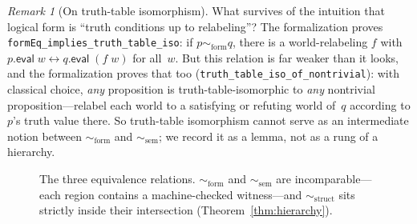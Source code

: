 \documentclass[10pt, letterpaper]{article}
\theoremstyle{definition}
\theoremstyle{remark}
\newtheorem{remark}[theorem]{Remark}
\newcommand{\eval}{\mathsf{eval}}
\newcommand{\structEq}{\sim_{\mathrm{struct}}}
\newcommand{\formEq}{\sim_{\mathrm{form}}}
\newcommand{\semEq}{\sim_{\mathrm{sem}}}
\begin{document}
\begin{remark}[On truth-table isomorphism]
\label{rem:tt-iso}
What survives of the intuition that logical form is
``truth conditions up to relabeling''?  The formalization proves
\texttt{formEq\_implies\_truth\_table\_iso}: if
$p \formEq q$, there is a world-relabeling $f$ with
$p.\eval\;w \leftrightarrow q.\eval\;(f\;w)$ for all~$w$.
But this relation is far weaker than it looks, and the
formalization proves that too
(\texttt{truth\_table\_iso\_of\_\allowbreak{}nontrivial}): with
classical choice, \emph{any} proposition is
truth-table-isomorphic to \emph{any} nontrivial
proposition---relabel each world to a satisfying or refuting
world of~$q$ according to $p$'s truth value there.  So
truth-table isomorphism cannot serve as an intermediate notion
between $\formEq$ and $\semEq$; we record it as a lemma, not as
a rung of a hierarchy.
\end{remark}

\begin{figure}[t]
\centering
{}
\caption{The three equivalence relations.  $\formEq$ and $\semEq$
  are incomparable---each region contains a machine-checked
  witness---and $\structEq$ sits strictly inside their
  intersection (Theorem~\ref{thm:hierarchy}).}
\label{fig:hierarchy}
\end{figure}
\end{document}
